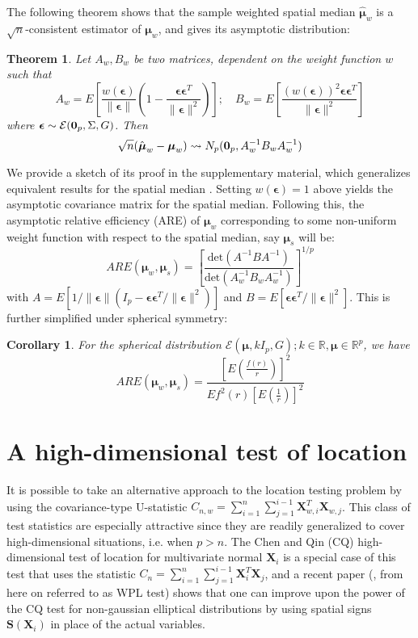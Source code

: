 \documentclass[12pt,letterpaper]{article}
\newcommand{\bfS}{{\mathbf {S}}}
\newcommand{\bfX}{{\mathbf {X}}}
\newcommand{\bfepsilon}{{\boldsymbol{\epsilon}}}
\newcommand{\bfmu}{{\boldsymbol{\mu}}}
\newtheorem{Theorem}{Theorem}[section]
\newtheorem{Corollary}{Corollary}[section]
\theoremstyle{Example}
\begin{document}
The following theorem shows that the sample weighted spatial median $\hat\bfmu_w$ is a $\sqrt n$-consistent estimator of $\bfmu_w$, and gives its asymptotic distribution:

\begin{Theorem}
Let $A_w, B_w$ be two matrices, dependent on the weight function $w$ such that
%
$$
A_w = E \left[ \frac{w( \bfepsilon ) }{\| \bfepsilon \|} \left( 1 - \frac{\bfepsilon \bfepsilon^T}{\| \bfepsilon \|^2} \right) \right]; \quad B_w = E \left[ \frac{(w( \bfepsilon ))^2 \bfepsilon \bfepsilon^T}{\| \bfepsilon \|^2} \right]
$$
%
where $\bfepsilon \sim \mathcal E({\bf 0}_p, \Sigma, G)$. Then
%
\begin{equation}
\sqrt n (\hat\bfmu_w - \bfmu_w) \leadsto N_p ({\bf 0}_p, A_w^{-1} B_w A_w^{-1})
\end{equation}
\end{Theorem}
%

We provide a sketch of its proof in the supplementary material, which generalizes equivalent results for the spatial median \citep{OjaBook10}. Setting $w(\bfepsilon)=1$ above yields the asymptotic covariance matrix for the spatial median. Following this, the asymptotic relative efficiency (ARE) of $\bfmu_w$ corresponding to some non-uniform weight function with respect to the spatial median, say $\bfmu_s$ will be:
%
$$
ARE( \bfmu_w, \bfmu_s) = \left[ \frac{\text{det} (A^{-1} B A^{-1})}{\text{det} (A_w^{-1} B_w A_w^{-1})} \right]^{1/p}
$$
%
with $A = E [ 1/ \| \bfepsilon \| ( I_p - \bfepsilon \bfepsilon^T/ \| \bfepsilon \|^2 ) ]$ and $B = E [ \bfepsilon \bfepsilon^T/ \| \bfepsilon \|^2 ]$. This is further simplified under spherical symmetry:

\begin{Corollary}
For the spherical distribution $\mathcal{E}(\bfmu, kI_p, G); k \in \mathbb R, \bfmu \in \mathbb R^p$, we have
%
$$
ARE( \bfmu_w, \bfmu_s) = \frac{ \left[ E \left( \frac{f(r)}{r} \right) \right]^2}{Ef^2(r) \left[ E \left( \frac{1}{r} \right) \right]^2 }
$$
\end{Corollary}



\section{A high-dimensional test of location}

It is possible to take an alternative approach to the location testing problem by using the covariance-type U-statistic $C_{n,w} = \sum_{i=1}^n \sum_{j=1}^{i-1} \bfX_{w,i}^T \bfX_{w,j}$. This class of test statistics are especially attractive since they are readily generalized to cover high-dimensional situations, i.e. when $p > n$. The Chen and Qin (CQ) high-dimensional test of location for multivariate normal $\bfX_i$ \citep{ChenQin10} is a special case of this test that uses the statistic $C_n = \sum_{i=1}^n \sum_{j=1}^{i-1} \bfX_i^T \bfX_j$, and a recent paper (\citep{WangPengLi15}, from here on referred to as WPL test) shows that one can improve upon the power of the CQ test for non-gaussian elliptical distributions by using spatial signs $\bfS(\bfX_i)$ in place of the actual variables.
\end{document}
